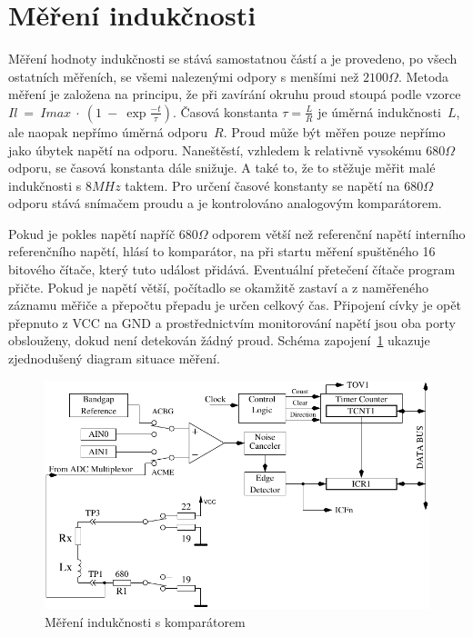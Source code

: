 \section{Měření indukčnosti}
Měření hodnoty indukčnosti se stává samostatnou částí a je provedeno, po všech ostatních měřeních, se všemi
nalezenými odpory s menšími než \(2100\Omega\).
Metoda měření je založena na principu, že při zavírání okruhu proud stoupá
podle vzorce \(Il~=~Imax~\cdot~(1~-~\exp{\frac{-t}{\tau}})\).
Časová konstanta \(\tau = \frac{L}{R}\) je úměrná indukčnosti~\(L\), ale naopak nepřímo
úměrná odporu~\(R\).
Proud může být měřen pouze nepřímo jako úbytek napětí na odporu.
Naneštěstí, vzhledem k relativně vysokému \(680\Omega\) odporu, se časová konstanta dále snižuje.
A také to, že to stěžuje měřit malé indukčnosti s \(8MHz\) taktem.
Pro určení časové konstanty se napětí na \(680\Omega\) odporu stává snímačem proudu a je kontrolováno
analogovým komparátorem.

Pokud je pokles napětí napříč \(680\Omega\) odporem větší než referenční napětí interního referenčního napětí,
hlásí to komparátor, na při startu měření spuštěného 16 bitového čítače, který tuto událost přidává.
Eventuální přetečení čítače program přičte.
Pokud je napětí větší, počítadlo se okamžitě zastaví a z naměřeného záznamu měřiče a přepočtu
přepadu je určen celkový čas.
Připojení cívky je opět přepnuto z VCC na GND a prostřednictvím monitorování napětí jsou oba porty obslouženy,
dokud není detekován žádný proud.
Schéma zapojení~\ref{fig:Inductance} ukazuje zjednodušený diagram situace měření.

\begin{figure}[H]
\centering
\includegraphics[width=.8\textwidth]{../FIG/Inductance.pdf}
\caption{Měření indukčnosti s komparátorem}
\label{fig:Inductance}
\end{figure}

